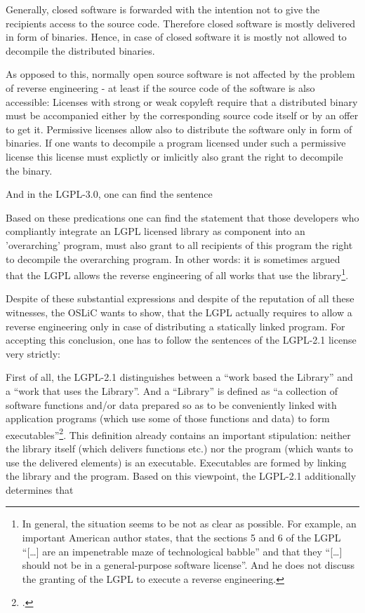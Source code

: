 Generally, closed software is forwarded with the intention not to give the
recipients access to the source code. Therefore closed software is mostly
delivered in form of binaries. Hence, in case of closed software it is mostly
not allowed to decompile the distributed binaries.

As opposed to this, normally open source software is not affected by the problem
of reverse engineering - at least if the source code of the software is also
accessible: Licenses with strong or weak copyleft require that a distributed
binary must be accompanied either by the corresponding source code itself or by
an offer to get it. Permissive licenses allow also to distribute the software
only in form of binaries. If one wants to decompile a program licensed under
such a permissive license this license must explictly or imlicitly also grant
the right to decompile the binary.




And in the LGPL-3.0, one can find the sentence


Based on these predications one can find the statement that those developers who
compliantly integrate an LGPL licensed library as component into an
'overarching' program, must also grant to all recipients of this program the
right to decompile the overarching program.  In other words: it is sometimes argued
that the LGPL allows the reverse engineering of all works that use the
library\footnote{In general, the situation seems to be not as clear as possible.
For example, an important American author states, that the sections 5 and 6 of
the LGPL \enquote{[\ldots] are an impenetrable maze of technological babble} and
that they \enquote{[\ldots] should not be in a general-purpose software
license}\cite[cf.][124]{Rosen2005a}. And he does not discuss the granting of
the LGPL to execute a reverse engineering.}.

Despite of these substantial expressions and despite of the reputation of all
these witnesses, the OSLiC wants to show, that the LGPL actually requires to
allow a reverse engineering only in case of distributing a statically linked
program. For accepting this conclusion, one has to follow the sentences of the
LGPL-2.1 license very strictly:

First of all, the LGPL-2.1 distinguishes between a \enquote{work based the
Library} and a \enquote{work that uses the Library}. And a \enquote{Library} is
defined as \enquote{a collection of software functions and/or data prepared so
as to be conveniently linked with application programs (which use some of those
functions and data) to form executables}\footcite[cf.][\nopage
wp §0]{Lgpl21OsiLicense1999a}. This definition already contains an important
stipulation: neither the library itself (which delivers functions etc.) nor the
program (which wants to use the delivered elements) is an executable.
Executables are formed by linking the library and the program. Based on this
viewpoint, the LGPL-2.1 additionally determines that 

